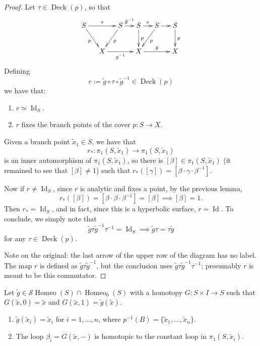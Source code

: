 \begin{proof}
Let $\tau\in\operatorname{Deck}(p)$, so
that
$$
\xymatrix@C=1.2em{
S \ar[rr]^{\tau} \ar[dr]_{p}
  && S \ar[dl]^{p}
     \ar[r]^{\tilde{g}^{-1}}
  & S \ar[r]^{\tau} \ar[d]^{p}
  & S \ar[dl]^{p} \ar[r]
  & S \ar[d]^{p} \\
  & X \ar[rr]_{g^{-1}}
  && X \ar[rr]^{g}
  && X
}
$$
Defining
$$
r:=\tilde{g}\circ\tau\circ
\tilde{g}^{-1}\in
\operatorname{Deck}(p)
$$
we have that:
\begin{enumerate}
\item $r\simeq\operatorname{Id}_S$.
\item $r$ fixes the branch points of the
cover $p:S\to X$.
\end{enumerate}
Given a branch point $\tilde{x}_1\in S$,
we have that
$$
r_*:\pi_1(S,\tilde{x}_1)\to
\pi_1(S,\tilde{x}_1)
$$
is an inner automorphism of
$\pi_1(S,\tilde{x}_1)$, so there is
$[\beta]\in\pi_1(S,\tilde{x}_1)$ (it
remained to see that $[\beta]\neq1$)
such that
$r_*([\gamma])
=[\beta\cdot\gamma\cdot\beta^{-1}]$.

Now if $r\neq\operatorname{Id}_S$,
since $r$ is analytic and fixes a point,
by the previous lemma,
$$
r_*([\beta])
=[\beta\cdot\beta\cdot\beta^{-1}]
=[\beta]\implies[\beta]=1.
$$
Then $r_*=\operatorname{Id}_S$, and in
fact, since this is a hyperbolic
surface, $r=\operatorname{Id}$. To
conclude, we simply note that
$$
\tilde{g}\tau\tilde{g}^{-1}\tau^{-1}
=\operatorname{Id}_S\implies
\tilde{g}\tau=\tau\tilde{g}
$$
for any $\tau\in\operatorname{Deck}(p)$.

Note on the original: the last arrow of
the upper row of the diagram has no
label. The map $r$ is defined as
$\tilde{g}\tau\tilde{g}^{-1}$, but the
conclusion uses
$\tilde{g}\tau\tilde{g}^{-1}\tau^{-1}$;
presumably $r$ is meant to be this
commutator.
\end{proof}

\begin{lemma}
\label{lemma-fixes-branch-points}
Let
$\tilde{g}\in
\mathcal{S}\operatorname{Homeo}(S)
\cap\operatorname{Homeo}_0(S)$
with a homotopy $G:S\times I\to S$ such
that $G(\tilde{x},0)=\tilde{x}$ and
$G(\tilde{x},1)=\tilde{g}(\tilde{x})$.
\begin{enumerate}
\item $\tilde{g}(\tilde{x}_i)
=\tilde{x}_i$
for $i=1,\ldots,n$, where
$p^{-1}(B)
=\{\tilde{x}_1,\ldots,\tilde{x}_n\}$.
\item The loop $\beta_i=G(\tilde{x},-)$
is homotopic to the constant loop in
$\pi_1(S,\tilde{x}_i)$.
\end{enumerate}
\end{lemma}


